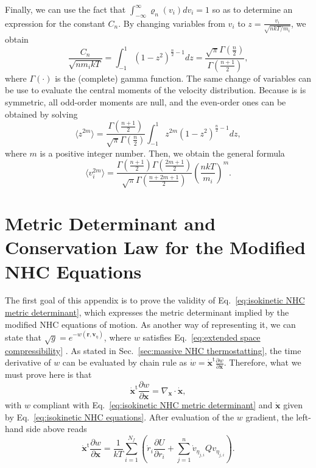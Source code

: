 \documentclass[
aip,
jcp,
reprint,
]{revtex4-1}
\newcommand{\vt}[1]{\boldsymbol{\mathbf{#1}}}          %
\newcommand{\tr}[1]{#1^\text{t}}                       %
\newcommand{\diff}[2]{\frac{\partial #2}{\partial #1}} %
\begin{document}
Finally, we can use the fact that $\int_{-\infty}^\infty \varrho_n(v_i) dv_i = 1$ so as to determine an expression for the constant $C_n$.
By changing variables from $v_i$ to $z = \frac{v_i}{\sqrt{{n k T}/{m_i}}}$, we obtain
\begin{equation}
\frac{C_n}{\sqrt{n m_i k T}} = \int_{-1}^{1} (1-z^2)^{\frac{n}{2}-1} dz = \frac{\sqrt{\pi} \Gamma\left(\frac{n}{2}\right)}{\Gamma\left(\frac{n+1}{2}\right)},
\end{equation}
where $\Gamma(\cdot)$ is the (complete) gamma function.
The same change of variables can be use to evaluate the central moments of the velocity distribution.
Because is is symmetric, all odd-order moments are null, and the even-order ones can be obtained by solving
\begin{equation}
\langle z^{2m} \rangle = \frac{\Gamma\left(\frac{n+1}{2}\right)}{\sqrt{\pi} \Gamma\left(\frac{n}{2}\right)} \int_{-1}^{1} z^{2m} (1-z^2)^{\frac{n}{2}-1} dz,
\end{equation}
where $m$ is a positive integer number.
Then, we obtain the general formula
\begin{equation}
\langle v_i^{2m} \rangle = \frac{\Gamma\left(\frac{n+1}{2}\right) \Gamma\left(\frac{2m+1}{2}\right)}{\sqrt{\pi}\Gamma\left(\frac{n+2m+1}{2}\right)} \left(\frac{n k T}{m_i}\right)^m.
\end{equation}

\section{Metric Determinant and Conservation Law for the Modified NHC Equations}
\label{sec:adapted NHC proofs}

The first goal of this appendix is to prove the validity of Eq.~\eqref{eq:isokinetic NHC metric determinant}, which expresses the metric determinant implied by the modified NHC equations of motion.
As another way of representing it, we can state that $\sqrt{g} = e^{-w(\vt r, \vt v_\eta)}$, where $w$ satisfies Eq.~\eqref{eq:extended space compressibility} \cite{Tuckerman_1999, Tuckerman_2001}.
As stated in Sec.~\ref{sec:massive NHC thermostatting}, the time derivative of $w$ can be evaluated by chain rule as $\dot{w} = \tr{\dot{\vt x}} \diff{\vt x}{w}$.
Therefore, what we must prove here is that \cite{Ezra_2004}
\begin{equation}
\label{eq:metric determinant proof equality}
\tr{\dot{\vt x}} \diff{\vt x}{w} = \nabla_{\vt x} \cdot \dot{\vt x},
\end{equation}
with $w$ compliant with Eq.~\eqref{eq:isokinetic NHC metric determinant} and $\dot{\vt x}$ given by Eq.~\eqref{eq:isokinetic NHC equations}.
After evaluation of the $w$ gradient, the left-hand side above reads
\begin{equation*}
\tr{\dot{\vt x}} \diff{\vt x}{w} = \frac{1}{kT} \sum_{i=1}^{N_f} \left(\dot{r}_i \diff{r_i}{U} + \sum_{j=1}^n \dot{v}_{\eta_{j,i}} Q v_{\eta_{j,i}} \right).
\end{equation*}
\end{document}
